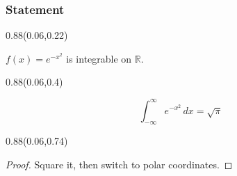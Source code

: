 \documentclass[aspectratio=169]{beamer}
\begin{document}
\begin{frame}[t]
  \frametitle{Statement}

\begin{textblock}{0.88}(0.06,0.22)
{\begin{definition}\raggedright\fontsize{15}{18}\selectfont $f(x) = e^{-x^2}$ is integrable on $\mathbb{R}$.\end{definition}\par}
\end{textblock}

\begin{textblock}{0.88}(0.06,0.4)
{\begin{theorem}[Gauss]\raggedright\fontsize{18}{22}\selectfont \[\int_{-\infty}^{\infty} e^{-x^2}\,dx = \sqrt{\pi}\]\end{theorem}\par}
\end{textblock}

\begin{textblock}{0.88}(0.06,0.74)
{\begin{proof}\raggedright\fontsize{15}{18}\selectfont Square it, then switch to polar coordinates.\end{proof}\par}
\end{textblock}
\end{frame}
\end{document}
